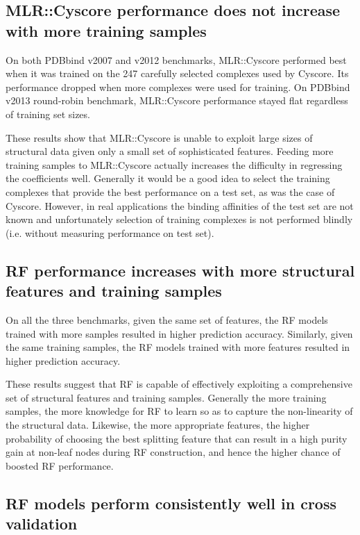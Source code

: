 \subsection{MLR::Cyscore performance does not increase with more training samples}

On both PDBbind v2007 and v2012 benchmarks, MLR::Cyscore performed best when it was trained on the 247 carefully selected complexes used by Cyscore. Its performance dropped when more complexes were used for training. On PDBbind v2013 round-robin benchmark, MLR::Cyscore performance stayed flat regardless of training set sizes.

These results show that MLR::Cyscore is unable to exploit large sizes of structural data given only a small set of sophisticated features. Feeding more training samples to MLR::Cyscore actually increases the difficulty in regressing the coefficients well. Generally it would be a good idea to select the training complexes that provide the best performance on a test set, as was the case of Cyscore. However, in real applications the binding affinities of the test set are not known and unfortunately selection of training complexes is not performed blindly (i.e. without measuring performance on test set).

\subsection{RF performance increases with more structural features and training samples}

On all the three benchmarks, given the same set of features, the RF models trained with more samples resulted in higher prediction accuracy. Similarly, given the same training samples, the RF models trained with more features resulted in higher prediction accuracy.

These results suggest that RF is capable of effectively exploiting a comprehensive set of structural features and training samples. Generally the more training samples, the more knowledge for RF to learn so as to capture the non-linearity of the structural data. Likewise, the more appropriate features, the higher probability of choosing the best splitting feature that can result in a high purity gain at non-leaf nodes during RF construction, and hence the higher chance of boosted RF performance.

\subsection{RF models perform consistently well in cross validation}

